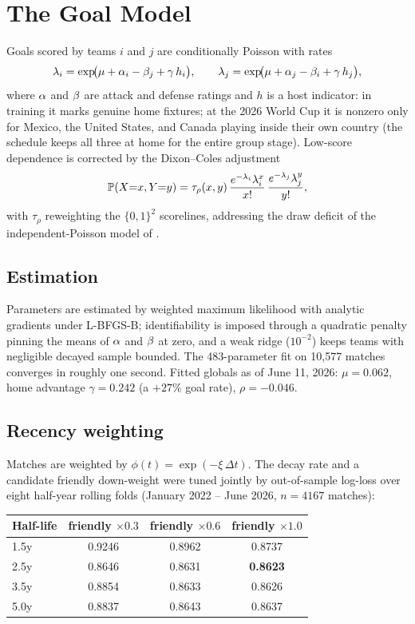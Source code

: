 \documentclass[11pt]{article}
\begin{document}
\section{The Goal Model}\label{sec:dc}
Goals scored by teams $i$ and $j$ are conditionally Poisson with rates
\begin{equation}
  \lambda_i = \exp\!\bigl(\mu + \alpha_i - \beta_j + \gamma\, h_i\bigr), \qquad
  \lambda_j = \exp\!\bigl(\mu + \alpha_j - \beta_i + \gamma\, h_j\bigr),
\end{equation}
where $\alpha$ and $\beta$ are attack and defense ratings and $h$ is a host
indicator: in training it marks genuine home fixtures; at the 2026 World Cup it
is nonzero only for Mexico, the United States, and Canada playing inside their
own country (the schedule keeps all three at home for the entire group stage).
Low-score dependence is corrected by the Dixon--Coles adjustment
\cite{dixoncoles1997}
\begin{equation}
  \mathbb{P}(X{=}x, Y{=}y) = \tau_{\rho}(x,y)\,
    \frac{e^{-\lambda_i}\lambda_i^{x}}{x!}\,
    \frac{e^{-\lambda_j}\lambda_j^{y}}{y!},
\end{equation}
with $\tau_\rho$ reweighting the $\{0,1\}^2$ scorelines, addressing the draw
deficit of the independent-Poisson model of \citet{maher1982}.

\subsection{Estimation}
Parameters are estimated by weighted maximum likelihood with analytic
gradients under L-BFGS-B; identifiability is imposed through a quadratic
penalty pinning the means of $\alpha$ and $\beta$ at zero, and a weak ridge
($10^{-2}$) keeps teams with negligible decayed sample bounded. The 483-parameter
fit on 10{,}577 matches converges in roughly one second. Fitted globals as of
June 11, 2026: $\mu = 0.062$, home advantage $\gamma = 0.242$ (a $+27\%$ goal
rate), $\rho = -0.046$.

\subsection{Recency weighting}\label{sec:decay}
Matches are weighted by $\phi(t) = \exp(-\xi\, \Delta t)$. The decay rate and a
candidate friendly down-weight were tuned jointly by out-of-sample log-loss
over eight half-year rolling folds (January 2022 -- June 2026, $n = 4167$
matches):

\begin{center}
\begin{tabular}{lccc}
\toprule
Half-life & friendly $\times 0.3$ & friendly $\times 0.6$ & friendly $\times 1.0$ \\
\midrule
1.5y & 0.9246 & 0.8962 & 0.8737 \\
2.5y & 0.8646 & 0.8631 & \textbf{0.8623} \\
3.5y & 0.8854 & 0.8633 & 0.8626 \\
5.0y & 0.8837 & 0.8643 & 0.8637 \\
\bottomrule
\end{tabular}
\end{center}
\end{document}

